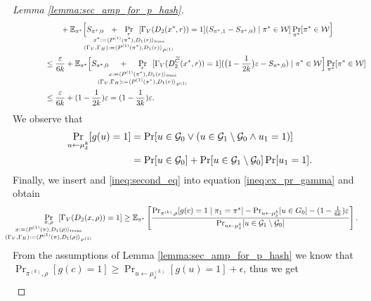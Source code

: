 \begin{proof}[Lemma \ref{lemma:sec_amp_for_p_hash}]
\begin{align}
&\IndIII +  \mathbb{E}_{\pi^*}\Bigl[ S_{\pi^*,0} \mkern13mu + \mkern13mu
\underset{
  \mathclap{
  \substack{r \\ x^* := \langle P^{(1)}(\pi^*), D_1(r) \rangle_{\mathit{trans}}
    \\ (\Gamma_V, \Gamma_H) := \langle P^{(1)}(\pi^*), D_1 (r) \rangle_{P^{(1)}} }}}
{\Pr}\mkern13mu[\Gamma_V(D_2(x^*, r)) = 1]
(S_{\pi^*,1} - S_{\pi^*,0})  \mid \pi^* \in \cW] \Pr_{\pi^*}[\pi^* \in \cW\Bigr] \notag\\
&\IndII \leq \frac{\epsilon}{6k} + \mathbb{E}_{\pi^*}\Bigl[ S_{\pi^*,0} \mkern23mu + \mkern23mu
\underset{
  \mathclap{
  \substack{r \\ x := \langle P^{(1)}(\pi^*), D_1(r) \rangle_{\mathit{trans}}
    \\ (\Gamma_V, \Gamma_H) := \langle P^{(1)}(\pi^*), D_1 (r) \rangle_{P^{(1)}} }}}
{\Pr}\mkern13mu[\Gamma_V(D_2^{\widetilde{C}}(x^*, r)) = 1]
(\bigl(1 - \frac{1}{2k}\bigr)\epsilon - S_{\pi^*,0})  \mid \pi^* \in \cW \Bigr] \Pr_{\pi^*}[\pi^* \in \cW] \notag\\
&\IndII \leq \frac{\epsilon}{6k} + (1 - \frac{1}{2k})\epsilon = (1 - \frac{1}{3k}) \epsilon.
\end{align}
We observe that
\begin{align}
  \label{eq:gu_rel}
\underset{u \leftarrow \mu_{\delta}^k}{\Pr}[g(u) = 1]
&= \Pr[u \in \mathcal{G}_0 \lor ( u \in \mathcal{G}_1 \setminus \mathcal{G}_0 \land u_1 = 1)] \notag\\
&= \Pr[u \in \mathcal{G}_0] + \Pr[u \in \mathcal{G}_1 \setminus \mathcal{G}_0] \Pr[u_1 = 1].
\end{align}
Finally, we insert and \eqref{ineq:second_eq} into equation \eqref{ineq:ex_pr_gamma} and obtain
\begin{align*}
  \IndII
\underset{
  \mathclap{
  \substack{\pi, \rho \\ x := \langle P^{(1)}(\pi), D_1(\rho) \rangle_{\text{trans}}
    \\ (\Gamma_V, \Gamma_H) := \langle P^{(1)}(\pi), D_1 (\rho) \rangle_{P^{(1)}} }}}
{\Pr}\mkern13mu[\Gamma_V(D_2(x, \rho)) = 1]
&\geq \mathbb{E}_{\pi^*}\left[\frac{{\Pr}_{\pi^{(k)}, \rho}[g(c) = 1 \mid \pi_1 = \pi^*] -
{\Pr}_{u \leftarrow \mu_{\delta}^{k}}[u \in G_0] - (1 - \frac{1}{6k})\epsilon} {\Pr_{u \leftarrow \mu_{\delta}^{k}}[u \in \cG_1 \setminus \cG_0]}\right] \notag.
 \end{align*}
 From the assumptions of Lemma \ref{lemma:sec_amp_for_p_hash} we know that $\Pr_{\pi^{(k)}, \rho} [g(c) = 1] \geq \Pr_{u \leftarrow \mu_{\delta}^{(k)}}[g(u) = 1] + \epsilon$,
 thus we get
 \begin{align}

\end{align}
\end{proof}
